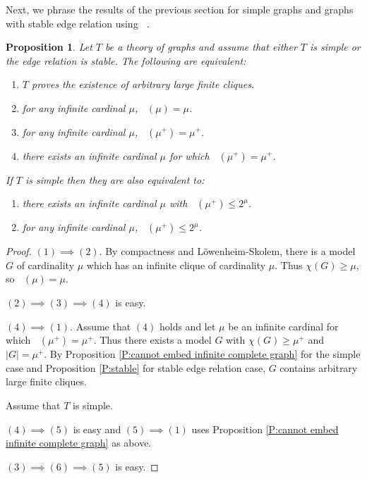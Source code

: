 \documentclass[a4paper]{amsart}
\theoremstyle{plain}
\newtheorem{proposition}[theorem]{Proposition}
\theoremstyle{definition}
\theoremstyle{remark}
\numberwithin{equation}{section}
\DeclareMathOperator{\ch}{ch_T}
\begin{document}
Next, we phrase the results of the previous section for simple graphs and graphs with stable edge relation using $\ch$. 

\begin{proposition}\label{P:chi for simple and stable}
Let $T$ be a theory of graphs and assume that either $T$ is simple or the edge relation is stable. The following are equivalent:
\begin{enumerate}
\item $T$ proves the existence of arbitrary large finite cliques.
\item for any infinite cardinal $\mu$, $\ch(\mu)= \mu$.
\item for any infinite cardinal $\mu$, $\ch(\mu^+)= \mu^+$.
\item there exists an infinite cardinal $\mu$ for which $\ch(\mu^+)=\mu^+$.
\end{enumerate}
If $T$ is simple then they are also equivalent to:
\begin{enumerate}
\item[(5)] there exists an infinite cardinal $\mu$ with $\ch(\mu^+)\leq 2^\mu$.
\item[(6)] for any infinite cardinal $\mu$,  $\ch(\mu^+)\leq 2^{\mu}$.
\end{enumerate}

\end{proposition}
\begin{proof}
$(1)\implies (2)$.  By compactness and L\"owenheim-Skolem, there is a model $G$ of cardinality  $\mu$ which has an infinite clique of cardinality $\mu$. Thus $\chi(G)\geq \mu$, so $\ch(\mu)=\mu$.

 $(2)\implies (3)\implies (4)$ is easy.
 
$(4)\implies (1)$.  Assume that $(4)$ holds and let $\mu$ be an infinite cardinal for which $\ch(\mu^+)=\mu^+$. Thus there exists a model $G$ with $\chi(G)\geq \mu^+$ and $|G|= \mu^+$. By Proposition \ref{P:cannot embed infinite complete graph} for the simple case and Proposition \ref{P:stable} for stable edge relation case, $G$ contains arbitrary large finite cliques.

Assume that $T$ is simple.

$(4)\implies (5)$ is easy and $(5)\implies (1)$ uses Proposition \ref{P:cannot embed infinite complete graph} as above. 

$(3)\implies (6)\implies (5)$ is easy.
\end{proof}
\end{document}
